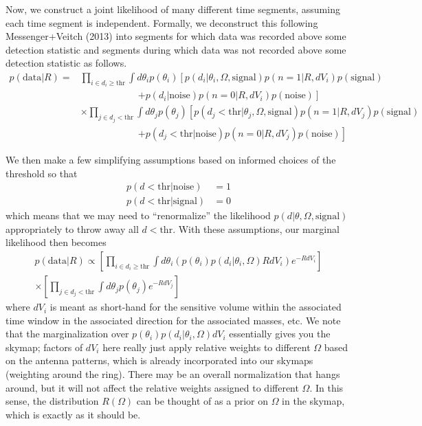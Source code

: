 \documentclass{article}
\begin{document}
Now, we construct a joint likelihood of many different time segments, assuming each time segment is independent.
Formally, we deconstruct this following Messenger+Veitch (2013) into segments for which data was recorded above some detection statistic and segments during which data was not recorded above some detection statistic as follows.
\begin{align}
    p(\mathrm{data}|R) = & \prod\limits_{i\in d_i\geq\mathrm{thr}} \int d\theta_i p(\theta_i) \left[ p(d_i|\theta_i, \Omega, \mathrm{signal}) p(n=1|R, dV_i) p(\mathrm{signal}) \right. \nonumber \\
                         & \quad \quad \quad \quad \quad \quad \left. + p(d_i|\mathrm{noise})p(n=0|R, dV_i) p(\mathrm{noise}) \right ] \nonumber \\
                         & \times \prod\limits_{j\in d_j<\mathrm{thr}} \int d\theta_j p(\theta_j) \left[ p(d_j<\mathrm{thr}|\theta_j, \Omega, \mathrm{signal})p(n=1|R, dV_j) p(\mathrm{signal}) \right. \nonumber \\
                         & \quad \quad \quad \quad \quad \quad \left. + p(d_j<\mathrm{thr}|\mathrm{noise})p(n=0|R,dV_j) p(\mathrm{noise}) \right] 
\end{align}

We then make a few simplifying assumptions based on informed choices of the threshold so that
\begin{align}
    p(d<\mathrm{thr}|\mathrm{noise}) & = 1 \\
    p(d<\mathrm{thr}|\mathrm{signal}) & = 0 
\end{align}
which means that we may need to ``renormalize'' the likelihood $p(d|\theta,\Omega,\mathrm{signal})$ appropriately to throw away all $d<\mathrm{thr}$.
With these assumptions, our marginal likelihood then becomes
\begin{multline}
    p(\mathrm{data}|R) \propto \left[ \prod\limits_{i\in d_i\geq\mathrm{thr}} \int d\theta_i \left( p(\theta_i) p(d_i|\theta_i, \Omega) R dV_i \right) e^{-R dV_i} \right] \\
    \times \left[ \prod\limits_{j\in d_j<\mathrm{thr}} \int d\theta_j p(\theta_j) e^{-RdV_j} \right]
\end{multline}
where $dV_i$ is meant as short-hand for the sensitive volume within the associated time window in the associated direction for the associated masses, etc.
We note that the marginalization over $p(\theta_i) p(d_i|\theta_i, \Omega) dV_i$ essentially gives you the skymap; factors of $dV_i$ here really just apply relative weights to different $\Omega$ based on the antenna patterns, which is already incorporated into our skymaps (weighting around the ring).
There may be an overall normalization that hangs around, but it will not affect the relative weights assigned to different $\Omega$.
In this sense, the distribution $R(\Omega)$ can be thought of as a prior on $\Omega$ in the skymap, which is exactly as it should be.
\end{document}
